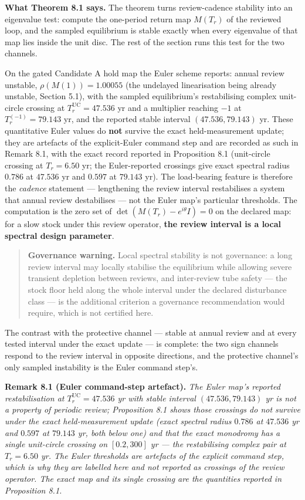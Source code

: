 \documentclass[11pt]{article}
\begin{document}
\textbf{What Theorem 8.1 says.} The theorem turns review-cadence
stability into an eigenvalue test: compute the one-period return map
\(M(T_r)\) of the reviewed loop, and the sampled equilibrium is stable
exactly when every eigenvalue of that map lies inside the unit disc. The
rest of the section runs this test for the two channels.

On the gated Candidate A hold map the Euler scheme reports: annual
review unstable, \(\rho(M(1)) = 1.00055\) (the undelayed linearisation
being already unstable, Section 5.1), with the sampled equilibrium's
restabilising complex unit-circle crossing at
\(T_r^{\mathrm{UC}} = 47.536\) yr and a multiplier reaching \(-1\) at
\(T_r^{(-1)} = 79.143\) yr, and the reported stable interval
\((47.536, 79.143)\) yr. These quantitative Euler values do \textbf{not}
survive the exact held-measurement update; they are artefacts of the
explicit-Euler command step and are recorded as such in Remark 8.1, with
the exact record reported in Proposition 8.1 (unit-circle crossing at
\(T_r = 6.50\) yr; the Euler-reported crossings give exact spectral
radius \(0.786\) at \(47.536\) yr and \(0.597\) at \(79.143\) yr). The
load-bearing feature is therefore the \emph{cadence} statement ---
lengthening the review interval restabilises a system that annual review
destabilises --- not the Euler map's particular thresholds. The
computation is the zero set of \(\det(M(T_r) - e^{i\theta}I) = 0\) on
the declared map: for a slow stock under this review operator,
\textbf{the review interval is a local spectral design parameter}.

\begin{quote}
\textbf{Governance warning.} Local spectral stability is not governance:
a long review interval may locally stabilise the equilibrium while
allowing severe transient depletion between reviews, and inter-review
tube safety --- the stock floor held along the whole interval under the
declared disturbance class --- is the additional criterion a governance
recommendation would require, which is not certified here.
\end{quote}

The contrast with the protective channel --- stable at annual review and
at every tested interval under the exact update --- is complete: the two
sign channels respond to the review interval in opposite directions, and
the protective channel's only sampled instability is the Euler command
step's.

\textbf{Remark 8.1 (Euler command-step artefact).} \emph{The Euler map's
reported restabilisation at \(T_r^{\mathrm{UC}} = 47.536\) yr with
stable interval \((47.536, 79.143)\) yr is not a property of periodic
review; Proposition 8.1 shows those crossings do not survive under the
exact held-measurement update (exact spectral radius \(0.786\) at
\(47.536\) yr and \(0.597\) at \(79.143\) yr, both below one) and that
the exact monodromy has a single unit-circle crossing on \([0.2, 300]\)
yr --- the restabilising complex pair at \(T_r = 6.50\) yr. The Euler
thresholds are artefacts of the explicit command step, which is why they
are labelled here and not reported as crossings of the review operator.
The exact map and its single crossing are the quantities reported in
Proposition 8.1.}
\end{document}
